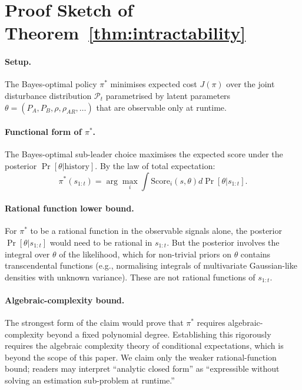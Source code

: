 \section{Proof Sketch of Theorem~\ref{thm:intractability}}
\label{app:intract-full}

\paragraph{Setup.} The Bayes-optimal policy $\pi^*$ minimises expected
cost $J(\pi)$ over the joint disturbance distribution $\mathcal{P}_t$
parametrised by latent parameters $\theta = (P_A, P_B, \rho, \rho_{AR},
\ldots)$ that are observable only at runtime.

\paragraph{Functional form of $\pi^*$.} The Bayes-optimal sub-leader
choice maximises the expected score under the posterior $\Pr[\theta |
\text{history}]$. By the law of total expectation:
\begin{equation}
  \pi^*(s_{1:t}) = \arg\max_i \int \mathrm{Score}_i(s, \theta)
                                d\Pr[\theta | s_{1:t}].
\end{equation}

\paragraph{Rational function lower bound.} For $\pi^*$ to be a rational
function in the observable signals alone, the posterior
$\Pr[\theta | s_{1:t}]$ would need to be rational in $s_{1:t}$. But the
posterior involves the integral over $\theta$ of the likelihood, which
for non-trivial priors on $\theta$ contains transcendental functions
(e.g., normalising integrals of multivariate Gaussian-like densities
with unknown variance). These are not rational functions of $s_{1:t}$.

\paragraph{Algebraic-complexity bound.} The strongest form of the claim
would prove that $\pi^*$ requires algebraic-complexity beyond a fixed
polynomial degree. Establishing this rigorously requires the algebraic
complexity theory of conditional expectations, which is beyond the
scope of this paper. We claim only the weaker rational-function
bound; readers may interpret ``analytic closed form'' as ``expressible
without solving an estimation sub-problem at runtime.''

